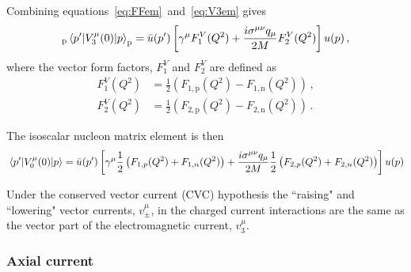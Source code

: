     Combining equations~\ref{eq:FFem}~and~\ref{eq:V3em} gives
    \begin{equation}
      _{\textrm{p}}\mel{p'}{V^{\mu}_3(0)}{p}_{\textrm{p}} 
        = \bar{u}(p') \left[\gamma^{\mu}F_1^V(Q^2) 
          + \frac{i\sigma^{\mu\nu}q_{\mu}}{2M}F_2^V(Q^2)\right] u(p) \,,
    \end{equation}
    where the vector form factors, $F_1^V$ and $F_2^V$ are defined as
    \begin{equation}
      \begin{aligned}
        F_1^V(Q^2) &= \frac{1}{2}\left( F_{1,\textrm{p}}(Q^2) - F_{1,\textrm{n}}(Q^2)\right) \,, \\
        F_2^V(Q^2) &= \frac{1}{2}\left( F_{2,\textrm{p}}(Q^2) - F_{2,\textrm{n}}(Q^2)\right) \,.
      \end{aligned}
    \end{equation}

    The isoscalar nucleon matrix element is then
    \begin{equation}
      {\mel{p'}{V^{\mu}_0(0)}{p}}
      = \bar{u}(p')\left[\gamma^{\mu}\frac{1}{2}\left(F_{1,p}(Q^2) + F_{1,n}(Q^2)\right) 
        + \frac{i\sigma^{\mu\nu}q_{\mu}}{2M}\frac{1}{2}\left(F_{2,p}(Q^2) + F_{2,n}(Q^2)\right)\right]u(p)
    \end{equation}
 
    Under the conserved vector current (CVC) hypothesis the ``raising" and
    ``lowering" vector currents, $v^{\mu}_{\pm}$, in the charged current
    interactions are the same as the vector part of the electromagnetic current,
    $v^{\mu}_{3}$.

  \subsubsection{Axial current}

